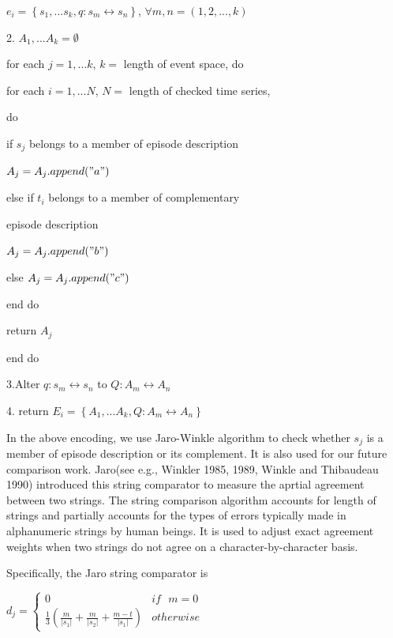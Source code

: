 \documentclass[10pt, conference, compsocconf]{IEEEtran}
\begin{document}
\par\quad $e_{i}=\left \{ s_{1},...s_{k},q:s_{m}\leftrightarrow s_{n} \right \}$, $\forall m,n=(1,2,...,k)$
\par
2. $A_{1},...A_{k}=\emptyset$
\par\quad for each $j=1,...k$, $k=$ length of event space, do
\par\quad for each $i=1,...N$, $N=$ length of checked time series,
\par\quad do
\par\quad if $s_{j}$ belongs to a member of episode description
\par\quad $A_{j}=A_{j}.append("a")$
\par\quad else if $t_{i}$ belongs to a member of complementary
\par\quad episode description
\par\quad $A_{j}=A_{j}.append("b")$
\par\quad else $A_{j}=A_{j}.append("c")$
\par\quad end do 
\par\quad return $A_{j}$ 
\par\quad end do
\par
3.Alter $q:s_{m}\leftrightarrow s_{n} $ to $Q:A_{m}\leftrightarrow A_{n}$
\par 
4. return $E_{i}=\left \{ A_{1},...A_{k},Q:A_{m}\leftrightarrow A_{n} \right \}$
\vspace{1.2mm}
\par
In the above encoding, we use Jaro-Winkle algorithm to check whether $s_{j}$ is a member of episode description or its complement. It is also used for our future comparison work. Jaro(see e.g., Winkler 1985, 1989, Winkle and Thibaudeau 1990) introduced this string comparator to measure the aprtial agreement between two strings. The string comparison algorithm accounts for length of strings and partially accounts for the types of errors typically made in alphanumeric strings by human beings. It is used to adjust exact agreement weights when two strings do not agree on a character-by-character basis.
\par
Specifically, the Jaro string comparator is
\vspace{2mm}
\par\quad  $d_{j}=\left\{\begin{matrix}
0 & if\: \: \: m=0\\ 
\frac{1}{3}(\frac{m}{\left | s_{1} \right |}+\frac{m}{\left | s_{2} \right |}+\frac{m-t}{\left | s_{1} \right |}) & otherwise
\end{matrix}\right. $
\end{document}
